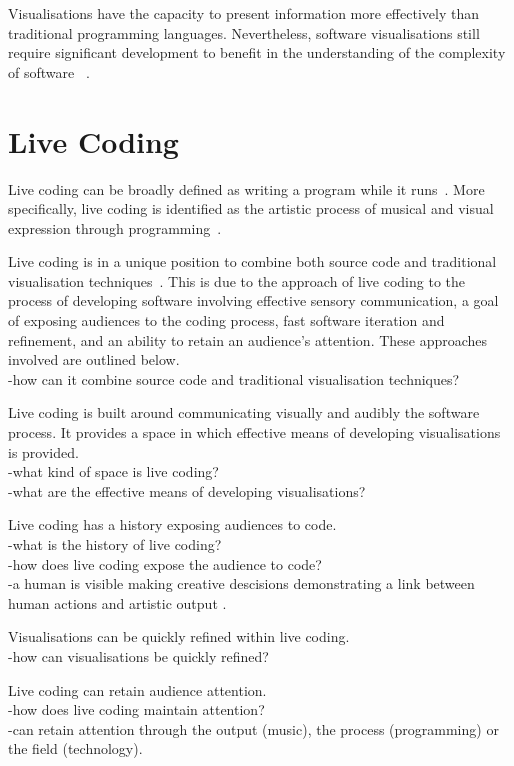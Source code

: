 Visualisations have the capacity to present information more effectively than traditional programming languages. Nevertheless, software visualisations still require significant development to benefit in the understanding of the complexity of software ~\cite{Baecker1995}.

\section{Live Coding}

Live coding can be broadly defined as writing a program while it runs~\cite{Ward2004}. More specifically, live coding is identified as the artistic process of musical and visual expression through programming~\cite{Collins2003}.

Live coding is in a unique position to combine both source code and traditional visualisation techniques~\cite{McLean2010a}. This is due to the approach of live coding to the process of developing software involving effective sensory communication, a goal of exposing audiences to the coding process, fast software iteration and refinement, and an ability to retain an audience's attention. These approaches involved are outlined below.\\
-how can it combine source code and traditional visualisation techniques?

Live coding is built around communicating visually and audibly the software process. It provides a space in which effective means of developing visualisations is provided. \\
-what kind of space is live coding?\\
-what are the effective means of developing visualisations?

Live coding has a history exposing audiences to code.\\
-what is the history of live coding?\\
-how does live coding expose the audience to code?\\
-a human is visible making creative descisions demonstrating a link between human actions and artistic output \cite{Mclean}.

Visualisations can be quickly refined within live coding.\\
-how can visualisations be quickly refined?

Live coding can retain audience attention.\\
-how does live coding maintain attention?\\
-can retain attention through the output (music), the process (programming) or the field (technology).

